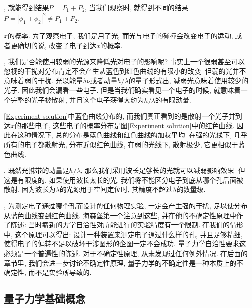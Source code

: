 \documentclass[a4paper,11pt]{article}
\begin{document}
, 就能得到结果$P=P_1+P_2$, 当我们观察时, 就得到不同的结果$P=|\phi_1+\phi_2|^2\neq P_1+P_2$.

$x$的概率. 为了观察电子, 我们是用了光, 而光与电子的碰撞会改变电子的运动, 或者更确切的说, 改变了电子到达$x$的概率.

, 我们是否能使用较弱的光源来降低光对电子的影响呢? 事实上一个很弱甚至可以忽视的干扰对分布肯定不会产生从蓝色到红色曲线的有限小的改变. 但弱的光并不意味着弱的干扰. 光以能量$h\nu$或者动量$h/\lambda$的量子形式出, 减弱光意味着使用较少的光子. 因此我们会漏看一些电子. 但是当我们确实看见一个电子的时候, 就意味着一个完整的光子被散射, 并且这个电子获得大约为$h/\lambda$的有限动量.

\ref{Experiment solution}中蓝色曲线分布的, 而我们真正看到的是散射一个光子并到达$x$的那些电子, 这些电子的概率分布是图\ref{Experiment solution}中的红色曲线. 因此在这种情况下, 总的分布是蓝色曲线和红色曲线的加权平均. 在强的光线下, 几乎所有的电子都散射光, 分布近似红色曲线, 在弱的光线下, 散射极少, 它更相似于蓝色曲线.

, 既然光携带的动量是$h/\lambda$, 那么我们采用波长足够长的光就可以减弱影响效果. 但这是有限度的, 如果使用波长太长的光, 我们将不能区分电子到底从哪个孔后面被散射. 因为波长为$\lambda$的光源用于空间定位时, 其精度不超过$\lambda$的数量级.

, 为测定电子通过哪个孔而设计的任何物理实验, 一定会产生强的干扰, 足以使分布从蓝色曲线变到红色曲线. 海森堡第一个注意到这些, 并在他的不确定性原理中作了陈述: 当时崭新的力学自洽性对所能进行的实验精度有一个限制. 在我们的情形中, 这个原理可以得出: 设计一种装置来测定电子通过什么样的孔, 并且足够精细, 使得电子的偏转不足以破坏干涉图形的企图一定不会成功. 量子力学自洽性要求这必须是一个普遍性的陈述. 对于不确定性原理, 从未发现过任何例外情况. 在后面的章节里, 我们会进一步讨论不确定性原理, 量子力学的不确定性是一种本质上的不确定性, 而不是实验所导致的.


\subsection{量子力学基础概念}
\end{document}
